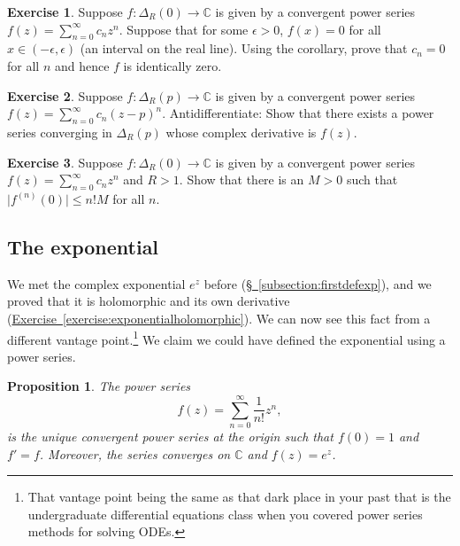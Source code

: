 \documentclass[12pt,openany]{book}
\newcommand{\sabs}[1]{\lvert {#1} \rvert}
\newcommand{\C}{{\mathbb{C}}}
\theoremstyle{plain}
\newtheorem{prop}[thm]{Proposition}
\theoremstyle{remark}
\theoremstyle{definition}
\newenvironment{exbox}{%
    \def\FrameCommand{\vrule width 1pt \relax\hspace{10pt}}%
    \MakeFramed{\advance\hsize-\width\FrameRestore}%
}{%
    \endMakeFramed
}
\theoremstyle{exercise}
\newtheorem{exercise}{Exercise}[section]
\theoremstyle{example}
\newcommand{\subsectionref}[1]{\hyperref[#1]{\S~\ref*{#1}}}
\newcommand{\exerciseref}[1]{\hyperref[#1]{Exercise~\ref*{#1}}}
\begin{document}
\begin{exbox}
\begin{exercise}
Suppose $f \colon \Delta_R(0) \to \C$ is given by a convergent power
series
$f(z) = \sum_{n=0}^\infty c_n z^n$.
Suppose that for some $\epsilon > 0$, $f(x) = 0$ for all $x \in
(-\epsilon,\epsilon)$ (an interval on the real line).
Using the corollary,
prove that $c_n = 0$ for all $n$ and hence $f$ is identically zero.
\end{exercise}

\begin{exercise} \label{exercise:antidefpowerser}
Suppose $f \colon \Delta_R(p) \to \C$ is given by a convergent power
series
$f(z) = \sum_{n=0}^\infty c_n {(z-p)}^n$.
Antidifferentiate:
Show that there exists a power series converging in $\Delta_R(p)$
whose complex derivative is $f(z)$.
\end{exercise}

\begin{exercise} 
Suppose $f \colon \Delta_R(0) \to \C$ is given by a convergent power
series
$f(z) = \sum_{n=0}^\infty c_n {z}^n$ and $R > 1$.
Show that there is an $M>0$ such that
$\sabs{f^{(n)}(0)} \leq n! M$ for all $n$.
\end{exercise}
\end{exbox}

\subsection{The exponential}

We met the complex exponential $e^z$ before
(\subsectionref{subsection:firstdefexp}), and we proved
that it is holomorphic and its own derivative
(\exerciseref{exercise:exponentialholomorphic}).  We can now see this fact
from a different vantage point.\footnote{%
That vantage point being the same as that dark place in your past
that is the undergraduate differential equations class when you covered
power series methods for solving ODEs.}
We claim we could have defined the exponential
using a power series.

\begin{prop}
The power series
\begin{equation*}
f(z) = \sum_{n=0}^\infty \frac{1}{n!} z^n ,
\end{equation*}
is the unique convergent power series at the origin
such that $f(0)=1$ and $f'=f$.
Moreover, the series converges on $\C$ and
$f(z) = e^z$.
\end{prop}
\end{document}
